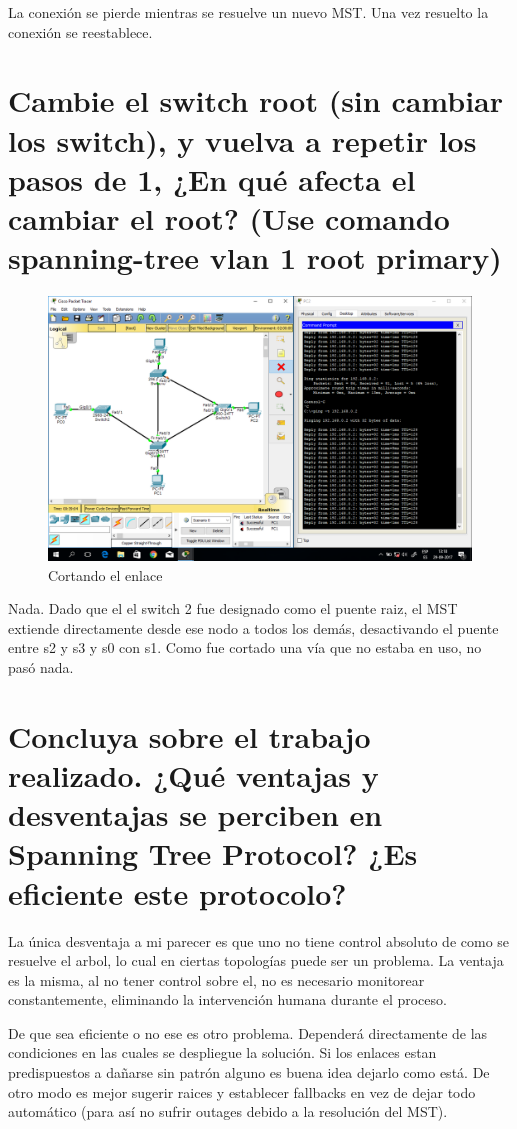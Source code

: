 \documentclass[11pt]{utalcaDoc}
\begin{document}
La conexión se pierde mientras se resuelve un nuevo MST. Una vez resuelto la conexión se reestablece.


\section{Cambie el switch root (sin cambiar los switch), y vuelva a repetir los pasos de 1, ¿En qu\'e afecta el cambiar el root? (Use comando spanning-tree vlan 1 root primary)}


\begin{figure}[!ht]
  \centering
\includegraphics[scale=.3]{3} 
  \caption{Cortando el enlace}
  \label{FIGURE:3}
\end{figure}

Nada. Dado que el el switch 2 fue designado como el puente raiz, el MST extiende directamente desde ese nodo a todos los demás, desactivando el puente entre s2 y s3 y s0 con s1. Como fue cortado una vía que no estaba en uso, no pasó nada.


\section{Concluya sobre el trabajo realizado. ¿Qu\'e ventajas y desventajas se perciben en Spanning Tree Protocol? ¿Es eficiente este protocolo?}

La única desventaja a mi parecer es que uno no tiene control absoluto de como se resuelve el arbol, lo cual en ciertas topologías puede ser un problema. La ventaja es la misma, al no tener control sobre el, no es necesario monitorear constantemente, eliminando la intervención humana durante el proceso.

De que sea eficiente o no ese es otro problema. Dependerá directamente de las condiciones en las cuales se despliegue la solución. Si los enlaces estan predispuestos a dañarse sin patrón alguno es buena idea dejarlo como está. De otro modo es mejor sugerir raices y establecer fallbacks en vez de dejar todo automático (para así no sufrir outages debido a la resolución del MST).
\end{document}
